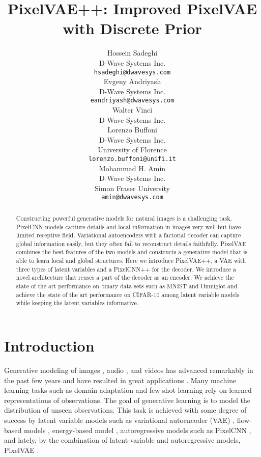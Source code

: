 \documentclass{article}
\title{PixelVAE++: Improved PixelVAE with Discrete Prior}
\author{Hossein Sadeghi \\
  D-Wave Systems Inc.\\
  \texttt{hsadeghi@dwavesys.com} \\
\And
  Evgeny Andriyash \\
  D-Wave Systems Inc. \\
  \texttt{eandriyash@dwavesys.com} \\
  \And
  Walter Vinci \\
   D-Wave Systems Inc.\\
\And
  Lorenzo Buffoni \\
   D-Wave Systems Inc.\\
  University of Florence \\
  \texttt{lorenzo.buffoni@unifi.it} \\
  \And
  Mohammad H. Amin \\
  D-Wave Systems Inc. \\
  Simon Fraser University \\
  \texttt{amin@dwavesys.com} \\
}
\begin{document}
\maketitle

\begin{abstract}
  Constructing powerful generative models for natural images is a challenging task. PixelCNN models capture details and local information in images very well but have limited receptive field. Variational autoencoders with a factorial decoder can capture global information easily, but they often fail to reconstruct details faithfully. PixelVAE combines the best features of the two models and constructs a generative model that is able to learn local and global structures. Here we introduce PixelVAE++, a VAE with three types of latent variables and a PixelCNN++ for the decoder. We introduce a novel architecture that reuses a part of the decoder as an encoder. We achieve the state of the art performance on binary data sets such as MNIST and Omniglot and achieve the state of the art performance on CIFAR-10 among latent variable models while keeping the latent variables informative.
\end{abstract}

\section{Introduction}

Generative modeling of images \cite{van2016conditional, goodfellow_generative_2014,  gregor2016towards, kingma2016improved, dinh2016density}, audio \cite{oord2016wavenet, mehri2016samplernn}, and videos \cite{kalchbrenner2017video, finn2016unsupervised} has advanced remarkably in the past few years and have resulted in great applications \cite{ledig2017photo, isola2017image}. Many machine learning tasks such as domain adaptation \cite{hoffman2013efficient, ghifary2014domain, bousmalis2017unsupervised, wang2018deep} and few-shot learning \cite{ravi2016optimization, santoro2016one, snell2017prototypical} rely on learned representations of observations.
The goal of generative learning is to model the distribution of unseen observations. This task is achieved with some degree of success by latent variable models such as variational autoencoder (VAE) \cite{kingma2013auto, rezende2014stochastic, salimans2015markov, kingma2016improved}, flow-based models \cite{kingma2018glow, rezende2015variational, dinh2014nice, dinh2016density}, energy-based model \cite{du2019implicit}, autoregressive models such as PixelCNN \cite{salimans2017pixelcnn++, van2016conditional, van2016pixel, oord2016wavenet, chen2017pixelsnail, germain2015made}, and lately, by the combination of latent-variable and autoregressive models, PixelVAE \cite{gulrajani2016pixelvae, chen2016variational}. 
\end{document}
